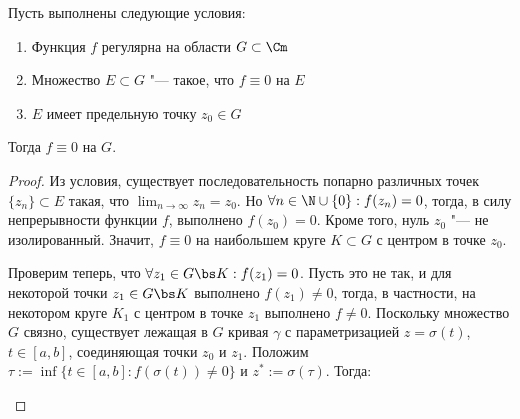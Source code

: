 \begin{theorem}
	Пусть выполнены следующие условия:
	\begin{enumerate}
		\item Функция $f$ регулярна на области $G \subset \Cm$
		\item Множество $E \subset G$ "--- такое, что $f \equiv 0$ на $E$
		\item $E$ имеет предельную точку $z_0 \in G$
	\end{enumerate}
	
	Тогда $f \equiv 0$ на $G$.
\end{theorem}

\begin{proof}
	Из условия, существует последовательность попарно различных точек $\{z_n\} \subset E$ такая, что $\lim_{n \to \infty}z_n = z_0$. Но $\forall n \in \N \cup \{0\}: f(z_n) = 0$, тогда, в силу непрерывности функции $f$, выполнено $f(z_0) = 0$. Кроме того, нуль $z_0$ "--- не изолированный. Значит, $f \equiv 0$ на наибольшем круге $K \subset G$ с центром в точке $z_0$.
	
	Проверим теперь, что $\forall z_1 \in G \bs K : f(z_1) = 0$. Пусть это не так, и для некоторой точки $z_1 \in G \bs K$ выполнено $f(z_1) \ne 0$, тогда, в частности, на некотором круге $K_1$ с центром в точке $z_1$ выполнено $f \ne 0$. Поскольку множество $G$ связно, существует лежащая в $G$ кривая $\gamma$ с параметризацией $z = \sigma(t)$, $t \in [a, b]$, соединяющая точки $z_0$ и $z_1$. Положим $\tau := \inf\{t \in [a, b]: f(\sigma(t)) \ne 0\}$ и $z^* := \sigma(\tau)$. Тогда:
	\begin{center}
\end{center}
\end{proof}
